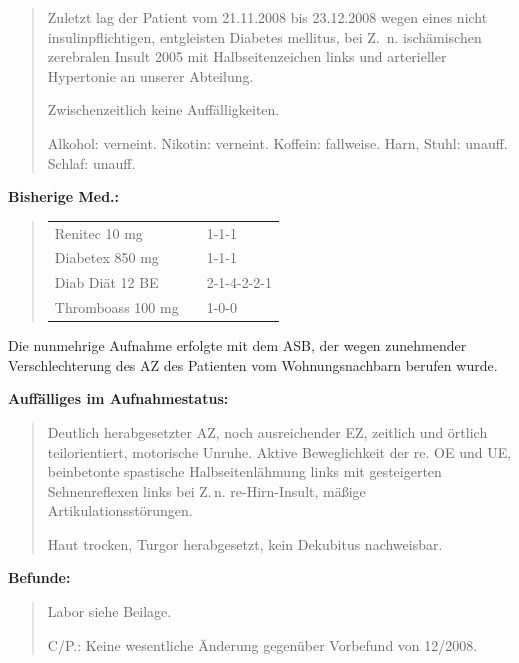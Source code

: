 {\begin{quote}
  Zuletzt lag der Patient vom 21.11.2008 bis 23.12.2008
  wegen eines nicht insulinpflichtigen, entgleisten Diabetes
  mellitus, bei Z.~n. ischämischen zerebralen Insult 2005
  mit Halbseitenzeichen links und arterieller Hypertonie an
  unserer Abteilung.
  
  Zwischenzeitlich keine Auffälligkeiten.
  
  Alkohol: verneint. Nikotin: verneint. Koffein: fallweise.
  Harn, Stuhl: unauff.
  Schlaf: unauff.
\end{quote}


{\bfseries Bisherige Med.:} 

\begin{quote}
  \begin{tabular}{lll}
Renitec 10 mg &&1-1-1
\\
Diabetex 850 mg &&1-1-1
\\
Diab Diät 12 BE &&2-1-4-2-2-1
\\
Thromboass 100 mg &&1-0-0
\\
\end{tabular}
\end{quote}





 Die nunmehrige Aufnahme erfolgte mit dem ASB, der wegen zunehmender
 Verschlechterung des AZ des Patienten vom Wohnungsnachbarn
 berufen wurde.

{\bfseries Auffälliges im Aufnahmestatus:}

\begin{quote}
 Deutlich herabgesetzter AZ, noch ausreichender EZ, zeitlich
 und örtlich teilorientiert, motorische Unruhe. Aktive
 Beweglichkeit der re. OE und UE, beinbetonte spastische
 Halbseitenlähmung links mit gesteigerten Sehnenreflexen
 links bei Z.\,n. re-Hirn-Insult, mäßige
 Artikulationsstörungen.
 
 Haut trocken, Turgor herabgesetzt, kein Dekubitus
 nachweisbar.
 \end{quote}

{\bfseries Befunde:}
\begin{quote}
Labor siehe Beilage.

C/P.: Keine
wesentliche Änderung gegenüber Vorbefund von 12/2008.


\end{quote}}
